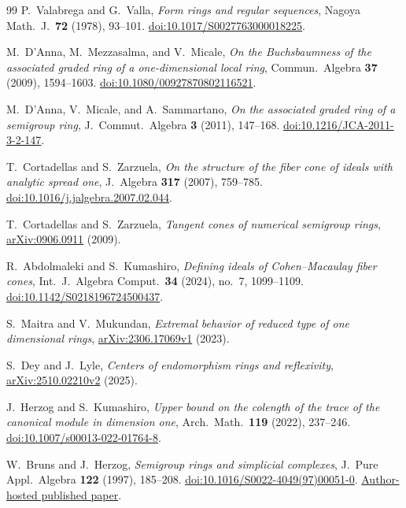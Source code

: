 \documentclass[11pt]{article}
\theoremstyle{definition}
\theoremstyle{remark}
\begin{document}
\begin{thebibliography}{99}
P.~Valabrega and G.~Valla,
\emph{Form rings and regular sequences},
Nagoya Math.\ J.\ \textbf{72} (1978), 93--101.
\href{https://doi.org/10.1017/S0027763000018225}{doi:10.1017/S0027763000018225}.

M.~D'Anna, M.~Mezzasalma, and V.~Micale,
\emph{On the Buchsbaumness of the associated graded ring of a one-dimensional local ring},
Commun.\ Algebra \textbf{37} (2009), 1594--1603.
\href{https://doi.org/10.1080/00927870802116521}{doi:10.1080/00927870802116521}.

M.~D'Anna, V.~Micale, and A.~Sammartano,
\emph{On the associated graded ring of a semigroup ring},
J.\ Commut.\ Algebra \textbf{3} (2011), 147--168.
\href{https://doi.org/10.1216/JCA-2011-3-2-147}{doi:10.1216/JCA-2011-3-2-147}.

T.~Cortadellas and S.~Zarzuela,
\emph{On the structure of the fiber cone of ideals with analytic spread one},
J.\ Algebra \textbf{317} (2007), 759--785.
\href{https://doi.org/10.1016/j.jalgebra.2007.02.044}{doi:10.1016/j.jalgebra.2007.02.044}.

T.~Cortadellas and S.~Zarzuela,
\emph{Tangent cones of numerical semigroup rings},
\href{https://arxiv.org/abs/0906.0911}{arXiv:0906.0911} (2009).

R.~Abdolmaleki and S.~Kumashiro,
\emph{Defining ideals of Cohen--Macaulay fiber cones},
Int.\ J.\ Algebra Comput.\ \textbf{34} (2024), no.~7, 1099--1109.
\href{https://doi.org/10.1142/S0218196724500437}{doi:10.1142/S0218196724500437}.

S.~Maitra and V.~Mukundan,
\emph{Extremal behavior of reduced type of one dimensional rings},
\href{https://arxiv.org/abs/2306.17069v1}{arXiv:2306.17069v1} (2023).

S.~Dey and J.~Lyle,
\emph{Centers of endomorphism rings and reflexivity},
\href{https://arxiv.org/abs/2510.02210v2}{arXiv:2510.02210v2} (2025).

J.~Herzog and S.~Kumashiro,
\emph{Upper bound on the colength of the trace of the canonical module in dimension one},
Arch.\ Math.\ \textbf{119} (2022), 237--246.
\href{https://doi.org/10.1007/s00013-022-01764-8}{doi:10.1007/s00013-022-01764-8}.

W.~Bruns and J.~Herzog,
\emph{Semigroup rings and simplicial complexes},
J.\ Pure Appl.\ Algebra \textbf{122} (1997), 185--208.
\href{https://doi.org/10.1016/S0022-4049(97)00051-0}{doi:10.1016/S0022-4049(97)00051-0}.
\href{https://www.home.uni-osnabrueck.de/wbruns/brunsw/pdf-article/SimpSemi.published.pdf}{Author-hosted published paper}.


\end{thebibliography}
\end{document}
